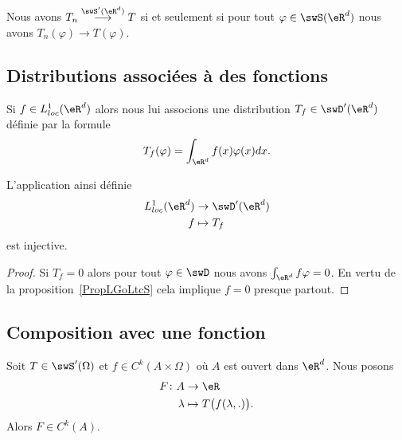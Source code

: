 \begin{proposition} \label{PropQAuJstI}
	Nous avons \( T_n\stackrel{\swS'(\eR^d)}{\longrightarrow}T\) si et seulement si pour tout \( \varphi\in\swS(\eR^d)\) nous avons \( T_n(\varphi)\to T(\varphi)\).
\end{proposition}

\subsection{Distributions associées à des fonctions}

Si \( f\in L^1_{loc}(\eR^d)\) alors nous lui associons une distribution \( T_f\in \swD'(\eR^d)\) définie par la formule
\begin{equation}
	T_f(\varphi)=\int_{\eR^d}f(x)\varphi(x)dx.
\end{equation}

\begin{proposition}
	L'application ainsi définie
	\begin{equation}
		\begin{aligned}
			L^1_{loc}(\eR^d) & \to \swD'(\eR^d) \\
			f                & \mapsto T_f
		\end{aligned}
	\end{equation}
	est injective.
\end{proposition}

\begin{proof}
	Si \( T_f=0\) alors pour tout \( \varphi\in \swD\) nous avons \( \int_{\eR^d}f\varphi=0\). En vertu de la proposition~\ref{PropLGoLtcS} cela implique \( f=0\) presque partout.
\end{proof}

\subsection{Composition avec une fonction}

\begin{proposition} \label{PropBQUOcyw}
	Soit \( T\in\swS'(\Omega)\) et \( f\in C^k(A\times \Omega)\) où \( A\) est ouvert dans \( \eR^d\). Nous posons
	\begin{equation}
		\begin{aligned}
			F\colon A & \to \eR                            \\
			\lambda   & \mapsto T\big( f(\lambda,.) \big).
		\end{aligned}
	\end{equation}
	Alors \( F\in C^k(A)\).
\end{proposition}

